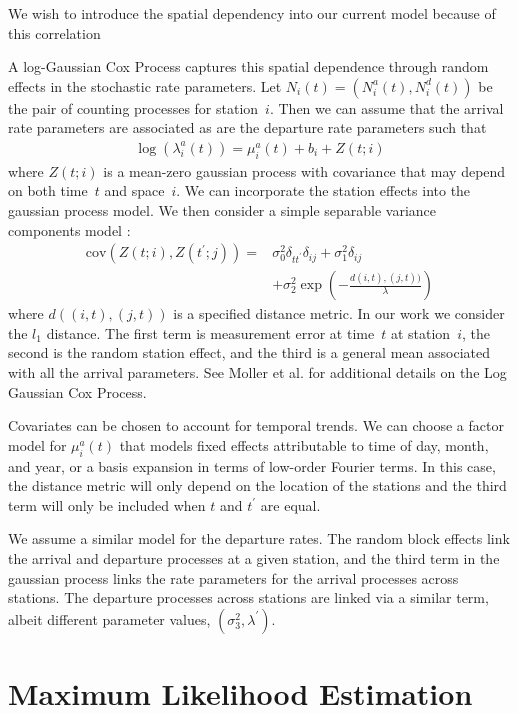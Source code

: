 \documentclass{acm_proc_article-sp}
\begin{document}
We wish to introduce the spatial dependency into our current model because of this correlation 

A log-Gaussian Cox Process captures this spatial dependence through random effects in the stochastic rate parameters.  Let $N_i (t) = (N_i^{a} (t), N_i^{d} (t))$ be the pair of counting processes for station~$i$.  Then we can assume that the arrival rate parameters are associated as are the departure rate parameters such that
\begin{align}
\log \left( \lambda_i^{a} (t) \right) = \mu^{a}_i(t) + b_i + Z(t;i)
\end{align}
\noindent where $Z(t;i)$ is a mean-zero gaussian process with covariance that may depend on both time~$t$ and space~$i$.  We can incorporate the station effects into the gaussian process model.  We then consider a simple separable variance components model :
\begin{align*}
\text{cov} ( Z(t;i) , Z(t^\prime; j) ) =& \sigma_0^2 \delta_{t t^\prime}  \delta_{i j} + \sigma_1^2  \delta_{i j} \\
&+ \sigma_2^2 \exp \left( -\frac{ d(i,t),(j,t)) }{\lambda} \right)
\end{align*}
\noindent where $d ( (i,t) , (j,t))$ is a specified distance metric. In our work we consider the $l_1$ distance.  The first term is measurement error at time~$t$ at station~$i$, the second is the random station effect, and the third is a general mean associated with all the arrival parameters.  See Moller et al. \cite{moller:coxproc} for additional details on the Log Gaussian Cox Process.

Covariates can be chosen to account for temporal trends.  We can choose a factor model for $\mu_i^{a} (t)$ that models fixed effects attributable to time of day, month, and year, or a basis expansion in terms of low-order Fourier terms.  In this case, the distance metric will only depend on the location of the stations and the third term will only be included when $t$ and $t^\prime$ are equal.

We assume a similar model for the departure rates.  The random block effects link the arrival and departure processes at a given station, and the third term in the gaussian process links the rate parameters for the arrival processes across stations.  The departure processes across stations are linked via a similar term, albeit different parameter values, $(\sigma_3^2, \lambda^\prime)$.

\section{Maximum Likelihood Estimation}
\end{document}
